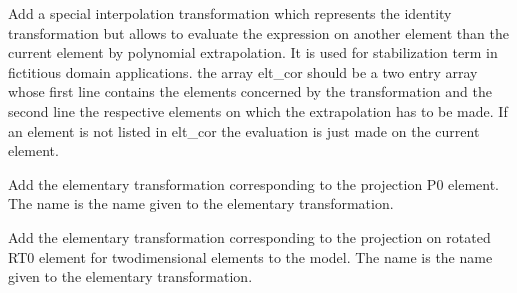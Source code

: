 \documentclass[a4paper,11pt,english]{sphinxmanual}
\begin{document}
\begin{fulllineitems}
\begin{fulllineitems}
\label{\detokenize{python/cmdref_Model:getfem.Model.add_element_extrapolation_transformation}}
Add a special interpolation transformation which represents the identity
transformation but allows to evaluate the expression on another element
than the current element by polynomial extrapolation. It is used for
stabilization term in fictitious domain applications. the array elt\_cor
should be a two entry array whose first line contains the elements
concerned by the transformation and the second line the respective
elements on which the extrapolation has to be made. If an element
is not listed in elt\_cor the evaluation is just made on the current
element.

\end{fulllineitems}


\begin{fulllineitems}
\label{\detokenize{python/cmdref_Model:getfem.Model.add_elementary_P0_projection}}
Add the elementary transformation corresponding to the projection
P0 element.
The name is the name given to the elementary transformation.

\end{fulllineitems}


\begin{fulllineitems}
\label{\detokenize{python/cmdref_Model:getfem.Model.add_elementary_rotated_RT0_projection}}
Add the elementary transformation corresponding to the projection
on rotated RT0 element for two\sphinxhyphen{}dimensional elements to the model.
The name is the name given to the elementary transformation.

\end{fulllineitems}


\end{fulllineitems}
\end{document}
